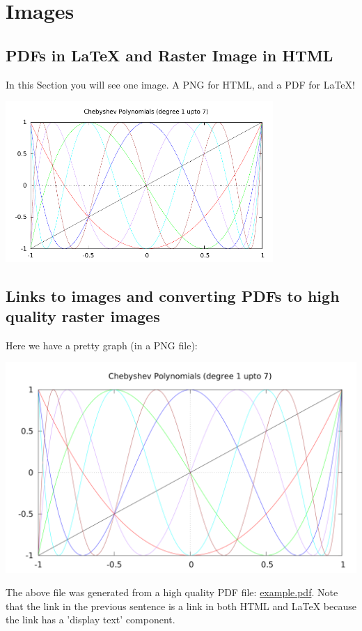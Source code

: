 \documentclass[11pt]{article}
\begin{document}
\section{Images}
\label{sec-3}

\subsection{PDFs in \LaTeX{} and Raster Image in HTML}
\label{sec-3-1}

In this Section you will see one image.  A PNG for HTML, and a PDF for \LaTeX{}!

\includegraphics[width=4in]{example.pdf}

\subsection{Links to images and converting PDFs to high quality raster images}
\label{sec-3-2}

Here we have a pretty graph (in a PNG file):

\includegraphics[width=.9\linewidth]{example.png}

The above file was generated from a high quality PDF file: \href{example.pdf}{example.pdf}. Note that the link in the previous sentence is a link in both HTML and \LaTeX{} because
the link has a 'display text' component.
\end{document}
